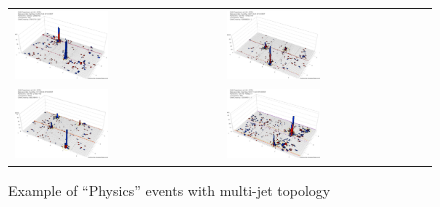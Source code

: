 %
\begin{figure}[h]
 \centering
 \begin{tabular}{ll}
   \includegraphics[width=0.47\textwidth]{fig/Physics2.eps} &
   \includegraphics[width=0.47\textwidth]{fig/Physics3.eps} \\
   \includegraphics[width=0.47\textwidth]{fig/Physics4.eps} &
   \includegraphics[width=0.47\textwidth]{fig/Physics6.eps} \\
 \end{tabular}
\caption{Example of ``Physics'' events with multi-jet topology}
\label{fig:Physics}
\end{figure}

